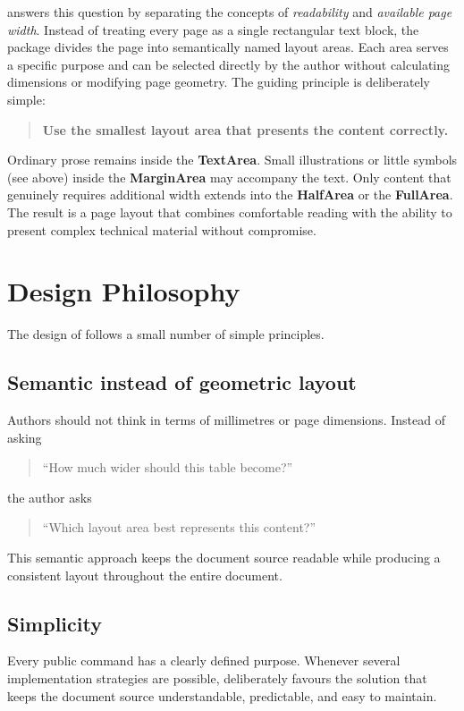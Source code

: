 \documentclass[
11pt,
a4paper,
oneside
]{scrbook}
\begin{document}
\noindent \MDWordmark answers this question by separating the concepts of
\emph{readability} and \emph{available page width}.
Instead of treating every page as a single rectangular text block, the package
divides the page into semantically named layout areas.
Each area serves a specific purpose and can be selected directly by the author
without calculating dimensions or modifying page geometry.
The guiding principle is deliberately simple:
\begin{quote}
	\textbf{Use the smallest layout area that presents the content correctly.}
\end{quote}
Ordinary prose remains inside the \textbf{TextArea}.
Small illustrations or little symbols (see above) inside the
\textbf{MarginArea} may accompany the text.
Only content that genuinely requires additional width extends into the
\textbf{HalfArea} or the \textbf{FullArea}.
The result is a page layout that combines comfortable reading with the ability
to present complex technical material without compromise.

\section{Design Philosophy}

The design of \MDWordmark follows a small number of simple principles.

\subsection{Semantic instead of geometric layout}
Authors should not think in terms of millimetres or page dimensions.
Instead of asking
\begin{quote}
	``How much wider should this table become?''
\end{quote}
the author asks
\begin{quote}
	``Which layout area best represents this content?''
\end{quote}
This semantic approach keeps the document source readable while producing a
consistent layout throughout the entire document.

\subsection{Simplicity}

Every public command has a clearly defined purpose.
Whenever several implementation strategies are possible,
\MDWordmark deliberately favours the solution that keeps the document
source understandable, predictable, and easy to maintain.
\end{document}
